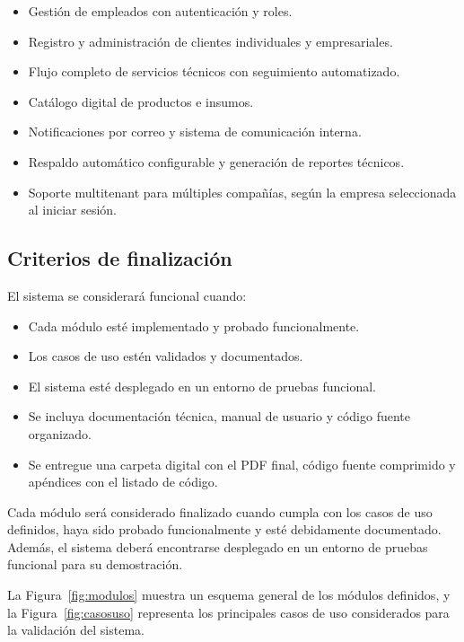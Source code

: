 \begin{itemize}
	\item Gestión de empleados con autenticación y roles.
	\item Registro y administración de clientes individuales y empresariales.
	\item Flujo completo de servicios técnicos con seguimiento automatizado.
	\item Catálogo digital de productos e insumos.
	\item Notificaciones por correo y sistema de comunicación interna.
	\item Respaldo automático configurable y generación de reportes técnicos.
	\item Soporte multitenant para múltiples compañías, según la empresa seleccionada al iniciar sesión.
\end{itemize}

\subsection*{Criterios de finalización}

El sistema se considerará funcional cuando:

\begin{itemize}
	\item Cada módulo esté implementado y probado funcionalmente.
	\item Los casos de uso estén validados y documentados.
	\item El sistema esté desplegado en un entorno de pruebas funcional.
	\item Se incluya documentación técnica, manual de usuario y código fuente organizado.
	\item Se entregue una carpeta digital con el PDF final, código fuente comprimido y apéndices con el listado de código.
\end{itemize}


	
	Cada módulo será considerado finalizado cuando cumpla con los casos de uso definidos, haya sido probado funcionalmente y esté debidamente documentado. Además, el sistema deberá encontrarse desplegado en un entorno de pruebas funcional para su demostración.
	
	La Figura~\ref{fig:modulos} muestra un esquema general de los módulos definidos, y la Figura~\ref{fig:casosuso} representa los principales casos de uso considerados para la validación del sistema.
	
	\vspace{0.5cm}
	
